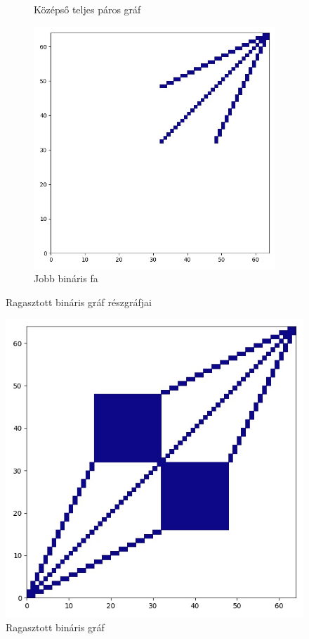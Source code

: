 \begin{figure}[H]
\begin{subfigure}{.3\linewidth}
    \caption{Középső teljes páros gráf}
  \end{subfigure}
  \begin{subfigure}{.3\linewidth}
    \centering
    \includegraphics[width=\linewidth]{./figures/ragasztott_binaris/subgraph_01.jpg}
    \caption{Jobb bináris fa}
  \end{subfigure}
  \caption{Ragasztott bináris gráf részgráfjai}
\end{figure}

\begin{figure}[H]
  \centering
  \includegraphics[width=0.5\linewidth]{./figures/ragasztott_binaris/graph.jpg}
  \caption{Ragasztott bináris gráf}
\end{figure}


